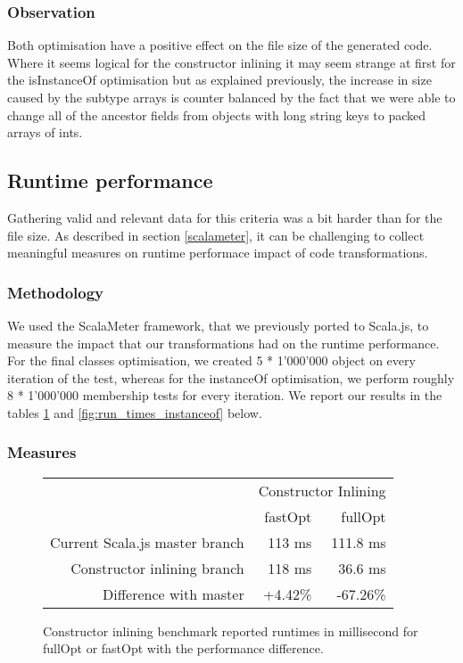 \subsubsection{Observation}
Both optimisation have a positive effect on the file size of the generated
code. Where it seems logical for the constructor inlining it may seem
strange at first for the isInstanceOf optimisation but as explained previously,
the increase in size caused by the subtype arrays is counter balanced by the
fact that we were able to change all of the ancestor fields from objects with
long string keys to packed arrays of ints.

\subsection{Runtime performance}
Gathering valid and relevant data for this criteria was a bit harder than for
the file size. As described in section \ref{scalameter}, it can be challenging
to collect meaningful measures on runtime performace impact of code
transformations.

\subsubsection{Methodology}
We used the ScalaMeter framework, that we previously ported to Scala.js, to
measure the impact that our transformations had on the runtime performance.
For the final classes optimisation, we created 5 * 1'000'000 object on every
iteration of the test, whereas for the instanceOf optimisation, we perform
roughly 8 * 1'000'000 membership tests for every iteration. We report our
results in the tables \ref{fig:run_times_ctor} and
\ref{fig:run_times_instanceof} below.


\subsubsection{Measures}

\begin{figure}[H]
  \centering
  \begin{tabular}{ | r | r | r | }\hline
    & \multicolumn{2}{|c|}{Constructor Inlining} \\
    & fastOpt & fullOpt \\ \hline
    Current Scala.js master branch & 113 ms & 111.8 ms\\
\hline \hline
    Constructor inlining branch & 118 ms & 36.6 ms \\ \hline
    Difference with master & +4.42\% & -67.26\%\\ \hline
 \end{tabular}
  \captionsetup{justification=centering}
  \caption{Constructor inlining benchmark reported runtimes in millisecond for
fullOpt or fastOpt with the performance difference.}
  \label{fig:run_times_ctor}
\end{figure}


